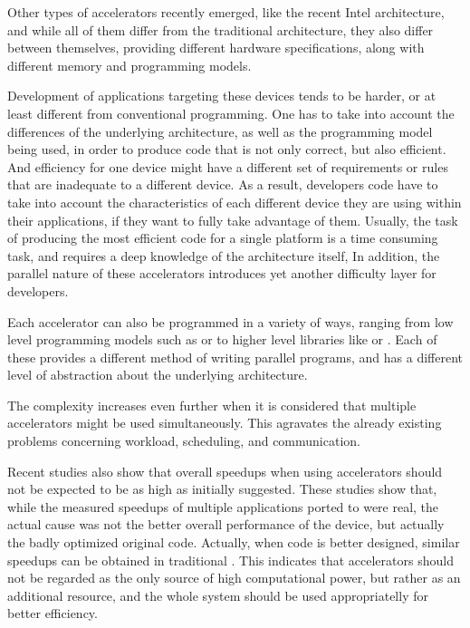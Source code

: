 \documentclass[main.tex]{subfiles}
\begin{document}
Other types of accelerators recently emerged, like the recent Intel \mic architecture, and while all of them differ from the traditional \cpu architecture, they also differ between themselves, providing different hardware specifications, along with different memory and programming models.

Development of applications targeting these devices tends to be harder, or at least different from conventional programming. One has to take into account the differences of the underlying architecture, as well as the programming model being used, in order to produce code that is not only correct, but also efficient. And efficiency for one device might have a different set of requirements or rules that are inadequate to a different device. As a result, developers code have to take into account the characteristics of each different device they are using within their applications, if they want to fully take advantage of them. Usually, the task of producing the most efficient code for a single platform is a time consuming task, and requires a deep knowledge of the architecture itself, In addition, the parallel nature of these accelerators introduces yet another difficulty layer for developers.

Each accelerator can also be programmed in a variety of ways, ranging from low level programming models such as \cuda or \opencl to higher level libraries like \openmp or \openacc. Each of these provides a different method of writing parallel programs, and has a different level of abstraction about the underlying architecture.

The complexity increases even further when it is considered that multiple accelerators might be used simultaneously. This agravates the already existing problems concerning workload, scheduling, and communication.

Recent studies \cite{lee2010debunking,bordawekar2010believe} also show that overall speedups when using accelerators should not be expected to be as high as initially suggested. These studies show that, while the measured speedups of multiple applications ported to \gpus were real, the actual cause was not the better overall performance of the device, but actually the badly optimized original \cpu code. Actually, when code is better designed, similar speedups can be obtained in traditional \cpus. This indicates that accelerators should not be regarded as the only source of high computational power, but rather as an additional resource, and the whole system should be used appropriatelly for better efficiency.
\end{document}
